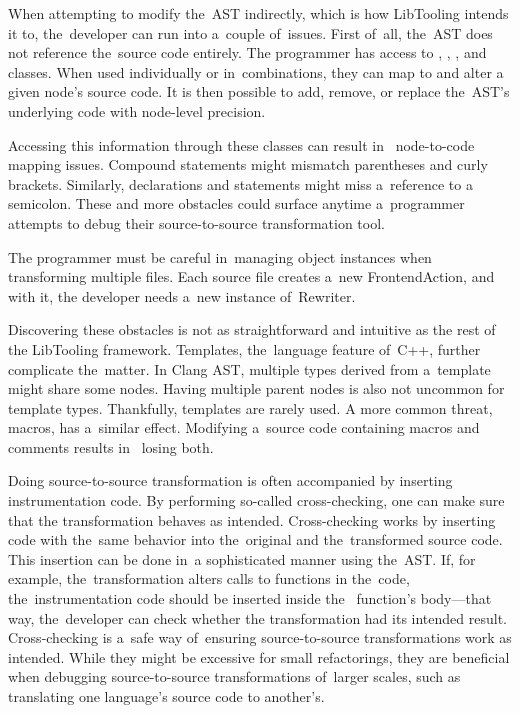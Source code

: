 When attempting to modify the~AST indirectly, which is how LibTooling 
intends it to, the~developer can run into a~couple of~issues. 
First of~all, the~AST does not reference the~source code entirely. 
The programmer has access to , ,
, and  classes. 
When used individually or in~combinations, they can map to and alter 
a given node's source code.
It is then possible to add, remove, or replace the~AST's underlying 
code with node-level precision.

Accessing this information through these classes can result in~
node-to-code mapping issues. 
Compound statements might mismatch parentheses and curly brackets. 
Similarly, declarations and statements might miss a~reference to 
a semicolon. 
These and more obstacles could surface anytime a~programmer attempts 
to debug their source-to-source transformation tool. 

The programmer must be careful in~managing object instances when 
transforming multiple files. 
Each source file creates a~new FrontendAction, and with it, 
the developer needs a~new instance of~Rewriter.

Discovering these obstacles is not as straightforward and intuitive as 
the rest of the LibTooling framework.
Templates, the~language feature of~C++, further complicate the~matter. 
In Clang AST, multiple types derived from a~template might share some nodes. 
Having multiple parent nodes is also not uncommon for template types. 
Thankfully, templates are rarely used. 
A more common threat, macros, has a~similar effect. 
Modifying a~source code containing macros and comments results in~
losing both.


Doing source-to-source transformation is often accompanied by 
inserting instrumentation code. 
By performing so-called cross-checking, one can make sure that 
the transformation behaves as intended. 
Cross-checking works by inserting code with the~same behavior 
into the~original and the~transformed source code.  
This insertion can be done in~a sophisticated manner using the~AST. 
If, for example, the~transformation alters calls to functions 
in the~code, the~instrumentation code should be inserted inside the~
function's body—that way, the~developer can check whether 
the transformation had its intended result.
Cross-checking is a~safe way of~ensuring source-to-source 
transformations work as intended. 
While they might be excessive for small refactorings, 
they are beneficial when debugging source-to-source 
transformations of~larger scales, such as translating 
one language's source code to another's.
